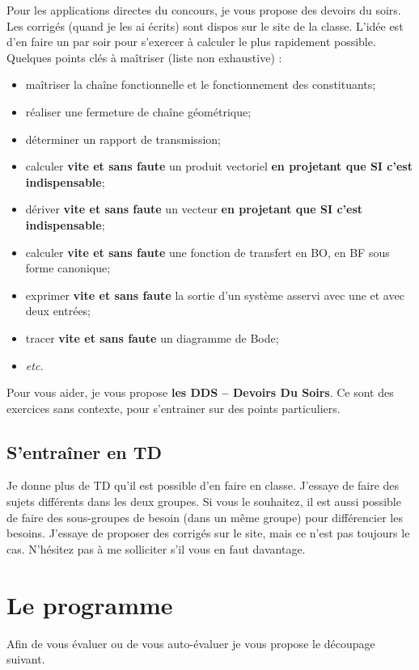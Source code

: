 Pour les applications directes du concours, je vous propose des devoirs du soirs. Les corrigés (quand je les ai écrits) sont dispos sur le site de la classe. L'idée est d'en faire un par soir pour s'exercer à calculer le plus rapidement possible. Quelques points clés à maîtriser (liste non exhaustive) : 
\begin{itemize}
\item maîtriser la chaîne fonctionnelle et le fonctionnement des constituants;
\item réaliser une fermeture de chaîne géométrique;
\item déterminer un rapport de transmission;
\item calculer \textbf{vite et sans faute} un produit vectoriel \textbf{en projetant que SI c'est indispensable};
\item dériver \textbf{vite et sans faute} un vecteur \textbf{en projetant que SI c'est indispensable};
\item calculer \textbf{vite et sans faute} une fonction de transfert en BO, en BF sous forme canonique;
\item exprimer \textbf{vite et sans faute} la sortie d'un système asservi avec une et avec deux entrées;
\item tracer \textbf{vite et sans faute} un diagramme de Bode;
\item \textit{etc.}
\end{itemize}

Pour vous aider, je vous propose \textbf{les DDS -- Devoirs Du Soirs}. Ce sont des exercices sans contexte, pour s'entrainer sur des points particuliers.

\subsection{S'entraîner en TD}
Je donne plus de TD qu'il est possible d'en faire en classe. J'essaye de faire des sujets différents dans les deux groupes. Si vous le souhaitez, il est aussi possible de faire des sous-groupes de besoin (dans un même groupe) pour différencier les besoins.
J'essaye de proposer des corrigés sur le site, mais ce n'est pas toujours le cas. N'hésitez pas à me solliciter s'il vous en faut davantage. 



\section{Le programme}

Afin de vous évaluer ou de vous auto-évaluer je vous propose le découpage suivant.

\begin{multicols}{2}
\allCompWide
\end{multicols}